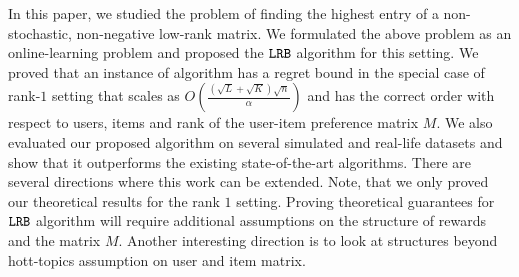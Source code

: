 In this paper, we studied the problem of finding the highest entry of a non-stochastic, non-negative low-rank matrix. We formulated the above problem as an online-learning problem and proposed the ${\tt LRB}$ algorithm for this setting. We proved that an instance of algorithm has a regret bound in the special case of rank-$1$ setting that scales as $O\left(\frac{\left(\sqrt{L } + \sqrt{K }\right) \sqrt{n}}{\alpha}\right)$ and has the correct order with respect to users, items and rank of the user-item preference matrix $M$. We also evaluated our proposed algorithm on several simulated and real-life datasets and show that it outperforms the existing state-of-the-art algorithms. There are several directions where this work can be extended. Note, that we only proved our theoretical results for the rank $1$ setting. Proving theoretical guarantees for ${\tt LRB}$ algorithm will require additional assumptions on the structure of rewards and the matrix $M$. Another interesting direction is to look at structures beyond hott-topics assumption on user and item matrix.

